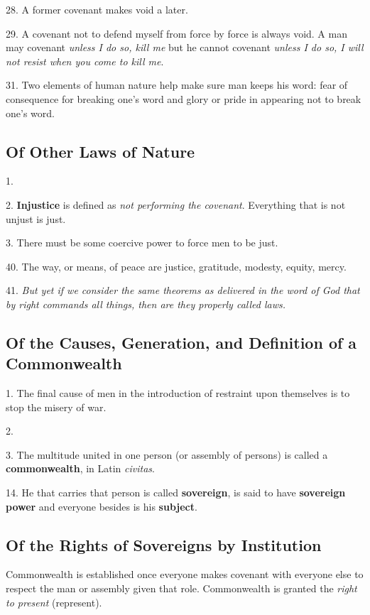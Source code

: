 28. A former covenant makes void a later.

29. A covenant not to defend myself from force by force is always void. A man
may covenant \textit{unless I do so, kill me} but he cannot covenant \textit{
unless I do so, I will not resist when you come to kill me}.

31. Two elements of human nature help make sure man keeps his word: fear of 
consequence for breaking one's word and glory or pride in appearing not to
break one's word.

\subsection{Of Other Laws of Nature}

1.

2. \textbf{Injustice} is defined as \textit{not performing the covenant}.
Everything that is not unjust is just.

3. There must be some coercive power to force men to be just.

40. The way, or means, of peace are justice, gratitude, modesty, equity,
mercy.

41. \textit{But yet if we consider the same theorems as delivered in the word
of God that by right commands all things, then are they properly called laws.}

\subsection{Of the Causes, Generation, and Definition of a Commonwealth}

1. The final cause of men in the introduction of restraint upon themselves is
to stop the misery of war.

2.

3. The multitude united in one person (or assembly of persons) is called a
\textbf{commonwealth}, in Latin \textit{civitas}.

14. He that carries that person is called \textbf{sovereign}, is said to have
\textbf{sovereign power} and everyone besides is his \textbf{subject}.

\subsection{Of the Rights of Sovereigns by Institution}

Commonwealth is established once everyone makes covenant with everyone else to
respect the man or assembly given that role. Commonwealth is granted the
\textit{right to present} (represent).

